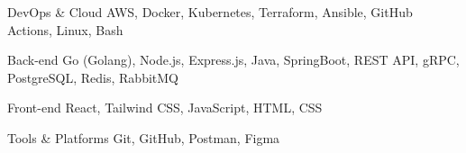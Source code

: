 
\begin{cvskills}

  \cvskill
    {DevOps \& Cloud} %
    {AWS, Docker, Kubernetes, Terraform, Ansible, GitHub Actions, Linux, Bash} %

  \cvskill
    {Back-end} %
    {Go (Golang), Node.js, Express.js, Java, SpringBoot, REST API, gRPC, PostgreSQL, Redis, RabbitMQ} %

  \cvskill
    {Front-end} %
    {React, Tailwind CSS, JavaScript, HTML, CSS} %

  \cvskill
    {Tools \& Platforms} %
    {Git, GitHub, Postman, Figma} %

\end{cvskills}

